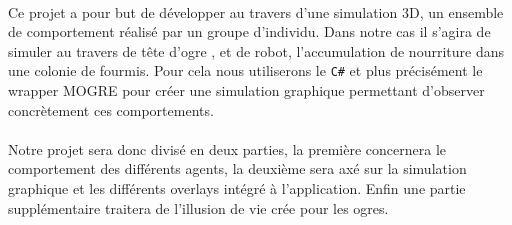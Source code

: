 \paragraph{}
Ce projet a pour but de développer au travers d'une simulation 3D, un
ensemble de comportement réalisé par un groupe d'individu. Dans notre cas il
s'agira de simuler au travers de tête d'ogre , et de robot, l'accumulation de
nourriture dans une colonie de fourmis. Pour cela nous utiliserons le
\verb!C#! et plus précisément le wrapper MOGRE pour créer une simulation
graphique permettant d'observer concrètement ces comportements.

\paragraph{}

Notre projet sera donc divisé en deux parties, la première concernera 
le comportement des différents agents, la deuxième sera axé sur la simulation
graphique et les différents overlays intégré à l'application. Enfin une partie
supplémentaire traitera de l'illusion de vie crée pour les ogres.

